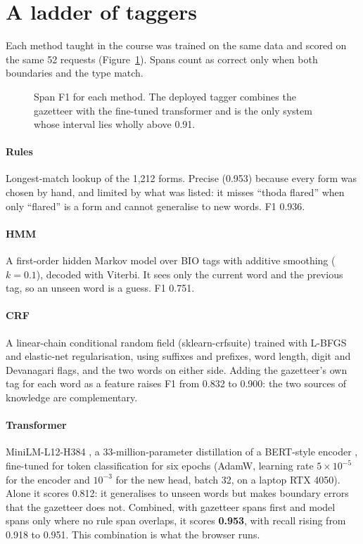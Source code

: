 \section{A ladder of taggers}
Each method taught in the course was trained on the same data and scored on the same 52 requests (Figure~\ref{fig:ladder}). Spans count as correct only when both boundaries and the type match.

\begin{figure}[tbp]
\centering
\resizebox{0.93\linewidth}{!}{}
\caption{Span F1 for each method. The deployed tagger combines the gazetteer with the fine-tuned transformer and is the only system whose interval lies wholly above 0.91.}
\label{fig:ladder}
\end{figure}

\paragraph{Rules} Longest-match lookup of the 1,212 forms. Precise (0.953) because every form was chosen by hand, and limited by what was listed: it misses ``thoda flared'' when only ``flared'' is a form and cannot generalise to new words. F1 0.936.

\paragraph{HMM} A first-order hidden Markov model over BIO tags with additive smoothing ($k=0.1$), decoded with Viterbi. It sees only the current word and the previous tag, so an unseen word is a guess. F1 0.751.

\paragraph{CRF} A linear-chain conditional random field (sklearn-crfsuite) trained with L-BFGS and elastic-net regularisation, using suffixes and prefixes, word length, digit and Devanagari flags, and the two words on either side. Adding the gazetteer's own tag for each word as a feature raises F1 from 0.832 to 0.900: the two sources of knowledge are complementary.

\paragraph{Transformer} MiniLM-L12-H384 \cite{wang2020minilm}, a 33-million-parameter distillation of a BERT-style encoder \cite{devlin2019bert}, fine-tuned for token classification for six epochs (AdamW, learning rate $5\times10^{-5}$ for the encoder and $10^{-3}$ for the new head, batch 32, on a laptop RTX 4050). Alone it scores 0.812: it generalises to unseen words but makes boundary errors that the gazetteer does not. Combined, with gazetteer spans first and model spans only where no rule span overlaps, it scores \textbf{0.953}, with recall rising from 0.918 to 0.951. This combination is what the browser runs.

